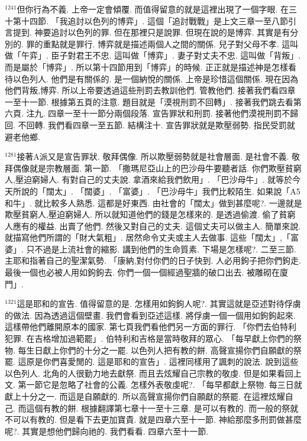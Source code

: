 \documentclass{book}
\begin{document}
$^{1241}$但你行為不義.
上帝一定會傾覆.
而值得留意的就是這裡出現了一個字眼.
在三十第十四節.
「我追討以色列的博弈」.
這個「追討戰戰」是上文三章一至八節引言提到.
神要追討以色列的罪.
但在那裡只是說罪.
但現在說的是博弈.
其實是有分別的.
罪的重點就是罪行.
博弈就是描述兩個人之間的關係.
兒子對父母不孝.
這叫做「午弈」.
臣子對君王不忠.
這叫做「博弈」.
妻子對丈夫不忠.
這叫做「背叛」.
而是屬於「博弈」.
所以第十四節用到「博弈」的時候.
正正就是描述神是怎樣看待以色列人.
他們是有關係的.
是一個納悅的關係.
上帝是珍惜這個關係.
現在因為他們背叛,博弈.
所以上帝要透過這些刑罰去教訓他們.
管教他們.
接著我們看四章一至十一節.
根據第五頁的注意.
題目就是「漠視刑罰不回轉」.
接著我們跳去看第六頁.
注九.
四章一至十一節分兩個段落.
宣告罪狀和刑罰.
接著他們漠視刑罰不歸回.
不回轉.
我們看四章一至五節.
結構注十.
宣告罪狀就是欺壓弱勢.
指民受罰就避老他鄉.

$^{1281}$接著A派又是宣告罪狀.
敬拜偶像.
所以欺壓弱勢就是社會層面.
是社會不義.
敬拜偶像就是宗教層面.
第一節.
「撒瑪尼亞山上的巴沙母牛要聽者話.
你們欺壓貧窮人,壓迫窮婦人.
有對自己的丈夫說.
拿酒來給我們飲用」.
「巴沙母牛」.
就等於今天所說的「闊太」.
「闊婆」.
「富婆」.
「巴沙母牛」我們比較陌生.
如果說「A5和牛」.
就比較多人熟悉.
這都是好東西.
由社會的「闊太」做到甚麼呢?.
一邊就是欺壓貧窮人,壓迫窮婦人.
所以就知道他們的錢是怎樣來的.
是透過偷渡.
偷了貧窮人應有的權益.
出賣了他們.
然後又對自己的丈夫.
這個丈夫可以做主人.
簡單來說.
就描寫他們所謂的「財大氣粗」.
居然命令丈夫或主人去做事.
這些「闊太」,「富婆」.
只不過是上流社會的縮影.
講到他們的生命質素.
下場是怎樣呢?.
二至三節.
主耶和指著自己的聖潔氣勢.
「康納,對付你們的日子快到.
人必用鉤子把你們鉤走.
最後一個也必被人用如鉤鉤去.
你們一個一個經過聖牆的破口出去.
被雕砌在廈門」.

$^{1321}$這是耶和的宣告.
值得留意的是.
怎樣用如鉤鉤人呢?.
其實這就是亞述對待俘虜的做法.
因為透過這個壁畫.
我們會看到亞述這樣.
將俘虜一個一個用如鉤鉤起來.
這樣帶他們離開原本的國家.
第七頁我們看他們另一方面的罪行.
「你們去伯特利犯罪.
在吉格增加過範罷」.
伯特利和吉格是當時敬拜的眾心.
「每早獻上你們的祭物.
每生日獻上你們的十分之一罷.
以色列人把有教的餅.
高聲宣揚你們自願獻的祭罷.
這原是你們喜愛閒的.
這是耶和的宣告」.
這裡同樣用了諷刺的說法.
說到這些以色列人.
北角的人很勤力地去獻祭.
而且去炫耀自己宗教的敬虔.
但是如果看回上文.
第一節它是忽略了社會的公義.
怎樣外表敬虔呢?.
「每早都獻上祭物.
每三日就獻上十分之一.
而這是自願獻的.
所以高聲宣揚你們自願獻的祭罷.
在這裡炫耀自己.
而這個有教的餅.
根據翻譯第七章十一至十三章.
是可以有教的.
而一般的祭就不可以有教的.
但是看下去更加寶貴.
就是四章六至十一節.
神給那麼多刑罰做甚麼呢?.
其實是想他們歸向祂的.
我們看看.
四章六至十一節.
\end{document}

